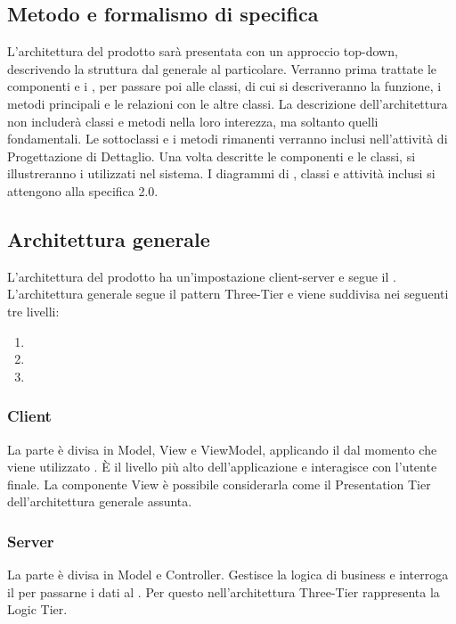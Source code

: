 \documentclass[a4paper, titlepage]{article}
\begin{document}
\subsection{Metodo e formalismo di specifica}
L'architettura del prodotto sarà presentata con un approccio top-down, descrivendo la struttura dal generale al particolare. Verranno prima trattate le componenti e i , per passare poi alle classi, di cui si descriveranno la funzione, i metodi principali e le relazioni con le altre classi. La descrizione dell'architettura non includerà classi e metodi nella loro interezza, ma soltanto quelli fondamentali. Le sottoclassi e i metodi rimanenti verranno inclusi nell'attività di Progettazione di Dettaglio.
	\newline
	Una volta descritte le componenti e le classi, si illustreranno i  utilizzati nel sistema. 
	\newline
	I diagrammi di , classi e attività inclusi si attengono alla specifica  2.0.
	
	\subsection{Architettura generale}
	L'architettura del prodotto ha un'impostazione client-server e segue il  . 
	\newline
	L'architettura generale segue il pattern Three-Tier e viene suddivisa nei seguenti tre livelli:
	\begin{enumerate}
		\item {} 
		\item {} 
		\item {}
	\end{enumerate}
	
	\subsubsection{Client}
	La parte  è divisa in Model, View e ViewModel, applicando il   dal momento che viene utilizzato . È il livello più alto dell'applicazione e interagisce con l'utente finale. La componente View è possibile considerarla come il Presentation Tier dell'architettura generale assunta.
	
	\subsubsection{Server}
	La parte  è divisa in Model e Controller. Gestisce la logica di business e interroga il  per passarne i dati al . Per questo nell'architettura Three-Tier rappresenta la Logic Tier.
	
\end{document}
